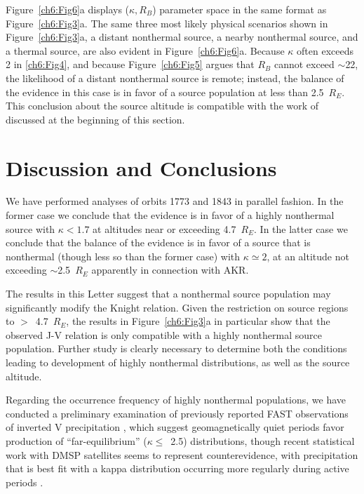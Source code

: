   Figure~\ref{ch6:Fig6}a displays ($\kappa, R_B$) parameter space in
  the same format as Figure~\ref{ch6:Fig3}a. The same three most
  likely physical scenarios shown in Figure~\ref{ch6:Fig3}a, a distant
  nonthermal source, a nearby nonthermal source, and a thermal source,
  are also evident in Figure~\ref{ch6:Fig6}a. Because $\kappa$ often
  exceeds 2 in \ref{ch6:Fig4}, and because Figure~\ref{ch6:Fig5}
  argues that $R_B$ cannot exceed $\sim$22, the likelihood of a
  distant nonthermal source is remote; instead, the balance of the
  evidence in this case is in favor of a source population at less
  than 2.5~$R_E$. This conclusion about the source altitude is
  compatible with the work of \citet{Ergun1998} discussed at the
  beginning of this section.


  \section{Discussion and Conclusions}

  We have performed analyses of orbits 1773 and 1843 in parallel
  fashion. In the former case we conclude that the evidence is in
  favor of a highly nonthermal source with $\kappa < 1.7$ at altitudes
  near or exceeding 4.7~$R_E$. In the latter case we conclude that the
  balance of the evidence is in favor of a source that is nonthermal
  (though less so than the former case) with $\kappa \simeq 2$, at an
  altitude not exceeding $\sim$2.5~$R_E$ apparently in connection with
  AKR.

  The results in this Letter suggest that a nonthermal source
  population may significantly modify the Knight relation. Given the
  restriction on source regions to $>$~4.7~$R_E$, the results in
  Figure~\ref{ch6:Fig3}a in particular show that the observed J-V
  relation is only compatible with a highly nonthermal source
  population. Further study is clearly necessary to determine both the
  conditions leading to development of highly nonthermal
  distributions, as well as the source altitude.

  Regarding the occurrence frequency of highly nonthermal populations,
  we have conducted a preliminary examination of previously reported
  FAST observations of inverted V precipitation
  \citep{McFadden1998a,Carlson2001,Janhunen2001,Dombeck2013}, which
  suggest geomagnetically quiet periods favor production of
  ``far-equilibrium'' ($\kappa \leq$~2.5) distributions, though recent
  statistical work with DMSP satellites seems to represent
  counterevidence, with precipitation that is best fit with a kappa
  distribution occurring more regularly during active periods
  \citep[e.g., Figure~7 in][]{McIntosh2014}.

